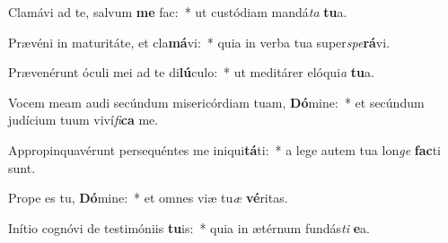 \item Clamávi ad te, salvum \textbf{me} fac:~* ut custódiam mandá\textit{ta} \textbf{tu}a.
\item Prævéni in maturitáte, et cla\textbf{má}vi:~* quia in verba tua super\textit{spe}\textbf{rá}vi.
\item Prævenérunt óculi mei ad te di\textbf{lú}culo:~* ut meditárer elóqui\textit{a} \textbf{tu}a.
\item Vocem meam audi secúndum misericórdiam tuam, \textbf{Dó}mine:~* et secúndum judícium tuum viví\textit{fi}\textbf{ca} me.
\item Appropinquavérunt persequéntes me iniqui\textbf{tá}ti:~* a lege autem tua lon\textit{ge} \textbf{fac}ti sunt.
\item Prope es tu, \textbf{Dó}mine:~* et omnes viæ tu\textit{æ} \textbf{vé}ritas.
\item Inítio cognóvi de testimóniis \textbf{tu}is:~* quia in ætérnum fundás\textit{ti} \textbf{e}a.
